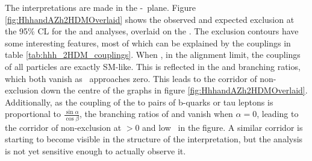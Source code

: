 The interpretations are made in the \cosba-\tanb~plane. Figure \ref{fig:HhhandAZh2HDMOverlaid}
shows the observed and expected exclusion at the 95\% \ac{CL} for the \Htohh
and \AtoZh analyses, overlaid on the \xsbr.
The exclusion contours have some interesting features, most of which can be explained by the couplings
in table \ref{tab:hhh_2HDM_couplings}. When , in the alignment limit, the couplings
of all particles are exactly \ac{SM}-like. This is reflected in the \Htohh and \AtoZh branching ratios, 
which both vanish as \cosba~approaches zero. This leads to the corridor of non-exclusion down the 
centre of the graphs in figure \ref{fig:HhhandAZh2HDMOverlaid}. Additionally,
as the coupling of the \PHiggslight to pairs of b-quarks or tau leptons is proportional 
to $\frac{\sin{\alpha}}{\cos{\beta}}$, the branching ratios of \Htohhtobbtautau
and \AtoZhtolltautau vanish when $\alpha = 0$, leading to the corridor of non-exclusion
at \cosba $ > 0$ and low \tanb~in the \AtoZh figure. A similar corridor is starting
to become visible in the \xsbr structure of the \Htohh interpretation, but
the analysis is not yet sensitive enough to actually observe it.



